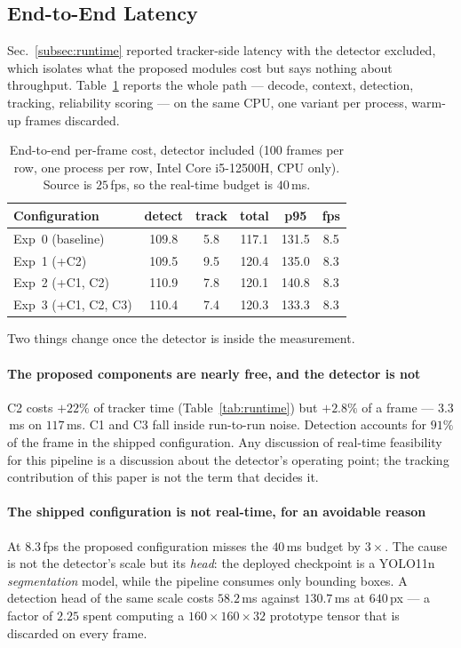 \subsection{End-to-End Latency}
\label{subsec:endtoend}

Sec.~\ref{subsec:runtime} reported tracker-side latency with the detector
excluded, which isolates what the proposed modules cost but says nothing about
throughput.
Table~\ref{tab:endtoend} reports the whole path --- decode, context,
detection, tracking, reliability scoring --- on the same CPU, one variant per
process, warm-up frames discarded.

\begin{table}[h]
  \centering
  \caption{End-to-end per-frame cost, detector included
           (100 frames per row, one process per row, Intel Core i5-12500H,
           CPU only). Source is $25$\,fps, so the real-time budget is
           $40$\,ms.}
  \label{tab:endtoend}
  \begin{tabular}{lccccc}
    \toprule
    Configuration & detect & track & total & p95 & fps \\
    \midrule
    Exp~0 (baseline)     & 109.8 & 5.8 & 117.1 & 131.5 & 8.5 \\
    Exp~1 (+C2)          & 109.5 & 9.5 & 120.4 & 135.0 & 8.3 \\
    Exp~2 (+C1, C2)      & 110.9 & 7.8 & 120.1 & 140.8 & 8.3 \\
    Exp~3 (+C1, C2, C3)  & 110.4 & 7.4 & 120.3 & 133.3 & 8.3 \\
    \bottomrule
  \end{tabular}
\end{table}

Two things change once the detector is inside the measurement.

\paragraph{The proposed components are nearly free, and the detector is not}
C2 costs $+22\%$ of tracker time (Table~\ref{tab:runtime}) but $+2.8\%$ of a
frame --- $3.3$\,ms on $117$\,ms.
C1 and C3 fall inside run-to-run noise.
Detection accounts for $91\%$ of the frame in the shipped configuration.
Any discussion of real-time feasibility for this pipeline is a discussion
about the detector's operating point; the tracking contribution of this paper
is not the term that decides it.

\paragraph{The shipped configuration is not real-time, for an avoidable reason}
At $8.3$\,fps the proposed configuration misses the $40$\,ms budget by
$3\times$.
The cause is not the detector's scale but its \emph{head}: the deployed
checkpoint is a YOLO11n \emph{segmentation} model, while the pipeline consumes
only bounding boxes.
A detection head of the same scale costs $58.2$\,ms against $130.7$\,ms at
$640$\,px --- a factor of $2.25$ spent computing a $160\times160\times32$
prototype tensor that is discarded on every frame.

